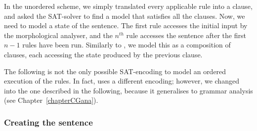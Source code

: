 In the unordered scheme, we simply translated every applicable rule into a clause, and asked the SAT-solver to find a model that satisfies all the clauses. 
Now, we need to model a state of the sentence. The first rule accesses the initial input
by the morphological analyser, and the $n^{th}$ rule accesses the sentence after the first $n-1$ rules have been run.
Similarly to \cite{lager_nivre01}, we model this as a composition of clauses, each accessing the state produced by the previous clause.


The following is not the only possible SAT-encoding to model an ordered execution of the rules. In fact, \cite{listenmaa_claessen2015} uses a different encoding; however, we changed into the one described in the following, because it generalises to grammar analysis (see Chapter~\ref{chapterCGana}).

\subsubsection{Creating the sentence}




